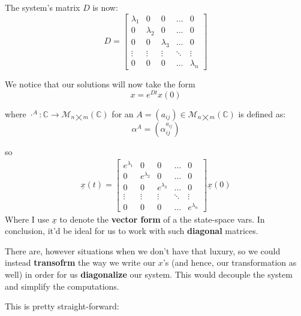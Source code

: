 The system's matrix $D$ is now:
\begin{equation*}
	D =
	\begin{bmatrix}
		\lambda_1 & 0         & 0         & \dots  & 0         \\
		0         & \lambda_2 & 0         & \dots  & 0         \\
		0         & 0         & \lambda_3 & \dots  & 0         \\
		\vdots    & \vdots    & \vdots    & \ddots & \vdots    \\
		0         & 0         & 0         & \dots  & \lambda_n
	\end{bmatrix}
\end{equation*}

We notice that our solutions will now take the form
\[
	x = e^{Dt}x(0)
\]

where $\cdot^A : \mathbb{C} \rightarrow \mathcal{M}_{n \bigtimes m}(\mathbb{C})$ for an $A = (a_{ij}) \in \mathcal{M}_{n \bigtimes m}(\mathbb{C})$ is defined as:
\[
	\alpha^A = (\alpha^{a_{ij}}_{ij})
\]

so
\begin{align*}
	\underline{x}(t) =
	\begin{bmatrix}
		e^{\lambda_1} & 0             & 0             & \dots  & 0             \\
		0             & e^{\lambda_2} & 0             & \dots  & 0             \\
		0             & 0             & e^{\lambda_3} & \dots  & 0             \\
		\vdots        & \vdots        & \vdots        & \ddots & \vdots        \\
		0             & 0             & 0             & \dots  & e^{\lambda_n}
	\end{bmatrix}
	\underline{x}(0)
\end{align*}
Where I use $\underline{x}$ to denote the \textbf{vector form} of a the state-space vars.
In conclusion, it'd be ideal for us to work with such \textbf{diagonal} matrices.

There are, however situations when we don't have that luxury, so we could instead \textbf{transofrm} the way we write our $x$'s (and hence, our transformation as well) in order for us \textbf{diagonalize} our system. This would decouple the system and simplify the computations.

This is pretty straight-forward:

